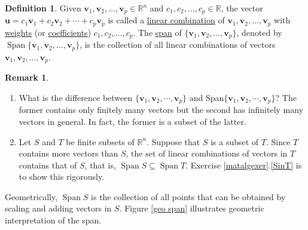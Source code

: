 \documentclass[12pt,letterpaper]{book}
\numberwithin{equation}{section}
\theoremstyle{definition}
\newtheorem{defi}[thm]{\textbf{Definition}}
\newtheorem{remark}[thm]{\textbf{Remark}}
\newcommand{\vu}{\bm{u}}
\newcommand{\vv}{\bm{v}}
\newcommand{\Span}{\operatorname{Span}}
\begin{document}
\begin{defi} Given $\vv_1,\vv_2,\ldots,\vv_p\in \mathbb{R}^n$
and $c_1,c_2,\ldots,c_p \in \mathbb{R}$, the vector
$\vu=c_1\vv_1+c_2\vv_2+\cdots+c_p\vv_p$ is called a
\underline{linear combination} of $\vv_1,\vv_2,\ldots,\vv_p$ with
\underline{weights} (or \underline{coefficients})
$c_1,c_2,\ldots,c_p$. The \underline{span} of $\{\vv_1,\vv_2,\ldots,\vv_p\}$, denoted by $\Span\{\vv_1,\vv_2,\ldots,\vv_p\}$, is
the collection of all linear combinations of vectors $\vv_1,\vv_2,\ldots,\vv_p$.
\end{defi}

\begin{remark}\quad
\begin{enumerate}
\item What is the difference between $\{\vv_1,\vv_2,\cdots,\vv_p\}$ and Span$\{\vv_1,\vv_2,\cdots,\vv_p\}$? The former contains only finitely many vectors but the second has infinitely many vectors in general. In fact, the former is a subset of the latter.
\item Let $S$ and $T$ be finite subsets of $\mathbb{R}^n$. Suppose that $S$ is a subset of $T$. Since $T$ contains more vectors than $S$, the set of linear combinations of vectors in $T$ contains that of $S$, that is, $\Span S \subseteq \Span T$. Exercise \ref{matalgexer}.\ref{SinT} is to show this rigorously.
\end{enumerate}
\end{remark}

Geometrically, $\Span S$ is the collection of all points that can be obtained by scaling and adding vectors in $S$. Figure \ref{geo span} illustrates geometric interpretation of the span. 
\end{document}
